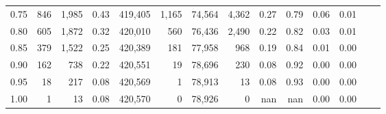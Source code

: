 \begin{tabular}{rrrrrrrrrrrrrr}
0.75 &      846 &  1,985 &    0.43 &  419,405 &    1,165 &  74,564 &   4,362 &  0.27 &  0.79 &  0.06 &      0.01 \\
0.80 &      605 &  1,872 &    0.32 &  420,010 &      560 &  76,436 &   2,490 &  0.22 &  0.82 &  0.03 &      0.01 \\
0.85 &      379 &  1,522 &    0.25 &  420,389 &      181 &  77,958 &     968 &  0.19 &  0.84 &  0.01 &      0.00 \\
0.90 &      162 &    738 &    0.22 &  420,551 &       19 &  78,696 &     230 &  0.08 &  0.92 &  0.00 &      0.00 \\
0.95 &       18 &    217 &    0.08 &  420,569 &        1 &  78,913 &      13 &  0.08 &  0.93 &  0.00 &      0.00 \\
1.00 &        1 &     13 &    0.08 &  420,570 &        0 &  78,926 &       0 &   nan &   nan &  0.00 &      0.00 \\
\bottomrule
\end{tabular}
